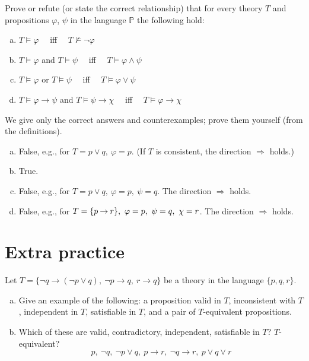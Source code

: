 \begin{problem}

    Prove or refute (or state the correct relationship) that for every theory $T$ and propositions $\varphi$, $\psi$ in the language $\mathbb{P}$ the following hold:
    \begin{enumerate}[(a)]
        \item $T \models \varphi$ \ \ iff \ \ $T \not\models \neg \varphi$
        \item $T \models \varphi$ and $T \models \psi$ \ \ iff \ \ $T \models \varphi \wedge \psi$
        \item $T \models \varphi$ or $T \models \psi$ \ \ iff \ \ $T \models \varphi \vee \psi$
        \item $T \models \varphi \to \psi$ and $T \models \psi \to \chi$ \ \ iff \ \ $T \models \varphi \to \chi$
    \end{enumerate}

    \begin{solution} 
        We give only the correct answers and counterexamples; prove them yourself (from the definitions).      
        \begin{enumerate}[(a)]
            \item False, e.g., for $T=p\lor q,\ \varphi=p$. (If $T$ is consistent, the direction $\Rightarrow$ holds.)
            \item True.
            \item False, e.g., for $T=p\lor q,\ \varphi=p,\ \psi=q$. The direction $\Rightarrow$ holds.
            \item False, e.g., for $T=\{p\limplies r\},\ \varphi=p,\ \psi=q,\ \chi=r$. The direction $\Rightarrow$ holds. 
        \end{enumerate}              
    \end{solution}
    
\end{problem}



\section*{Extra practice}


\begin{problem}
        
    Let $T=\{\neg q \to (\neg p \vee q),\ \neg p \to q,\ r \to q\}$ be a theory in the language $\{p, q, r\}$.
    \begin{enumerate}[(a)]
        \item Give an example of the following: a proposition valid in $T$, inconsistent with $T$, independent in $T$, satisfiable in $T$, and a pair of $T$-equivalent propositions.
        \item Which of these are valid, contradictory, independent, satisfiable in $T$? $T$-equivalent? 
        $$
        p, \ \neg q, \ \neg p\vee q, \ p\to r,\ \neg q\to r, \ p\vee q\vee r
        $$
    \end{enumerate}

\end{problem}



